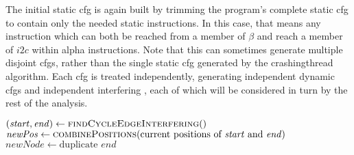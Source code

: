 The initial \gls{static cfg} is again built by trimming the program's
complete \gls{static cfg} to contain only the needed static
instructions.  In this case, that means any instruction which can both
be reached from a member of $\beta$ and reach a member of $i2c$ within
\gls{alpha} instructions.  Note that this can sometimes generate
multiple disjoint \glspl{cfg}, rather than the single \gls{static cfg}
generated by the \gls{crashingthread} algorithm.  Each \gls{cfg} is
treated independently, generating independent \glspl{dynamic cfg} and
independent interfering {\StateMachines}, each of which will be
considered in turn by the rest of the analysis.

\begin{sanefig}
\begin{algorithmic}
       \State $(\mathit{start}, \mathit{end}) \gets \textsc{findCycleEdgeInterfering}()$
       \State $\mathit{newPos} \gets \textsc{combinePositions}(\text{current positions of } \mathit{start} \text{ and } \mathit{end})$
           \State $\mathit{newNode} \gets \text{duplicate } \mathit{end}$
           \EndFor
       \EndIf
    \EndWhile
  \EndFunction
\end{algorithmic}
\caption{Loop unrolling algorithm for interfering thread CFGs.
  \textsc{findCycleEdgeInterfering} and \textsc{combinePositions} are described
  in the text.}
\label{fig:derive:store_cfg_unroll_alg}
\end{sanefig}

